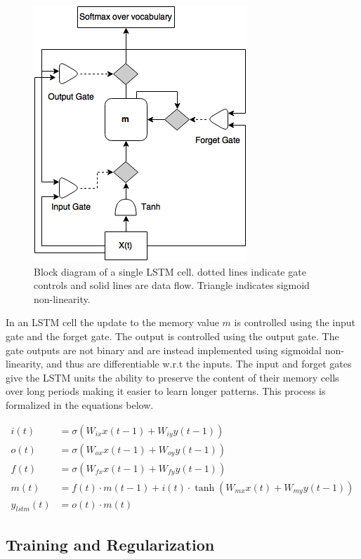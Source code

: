 \begin{figure}[h]
	\begin{center}
		\includegraphics[width=0.5\linewidth]{images/LstmCell.png}
	\end{center}
	\caption{Block diagram of a single LSTM cell. dotted lines indicate
		gate controls and solid lines are data flow. Triangle indicates
		sigmoid non-linearity.}
	\label{fig_lstmcell}
\end{figure}

In an LSTM cell the update to the memory value $m$ is controlled using the
input gate and the forget gate.  The output is controlled using the output
gate. The gate outputs are not binary and are instead implemented using sigmoidal
non-linearity, and thus are differentiable w.r.t the inputs. 
The input and forget gates give the LSTM units the ability to preserve the
content of their memory cells over long periods making it easier to learn
longer patterns.
This process is formalized in the equations below.

\begin{align}
	i(t) &= \sigma(W_{ix}x(t-1) + W_{iy}y(t-1))\\
	o(t) &= \sigma(W_{ox}x(t-1) + W_{oy}y(t-1))\\
	f(t) &= \sigma(W_{fx}x(t-1) + W_{fy}y(t-1))\\
	m(t) &= f(t)\cdot m(t-1) + i(t)\cdot \tanh(W_{mx}x(t)+W_{my}y(t-1))\\
	y_{lstm}(t) &= o(t) \cdot m(t)
\end{align}


\subsection{Training and Regularization}
